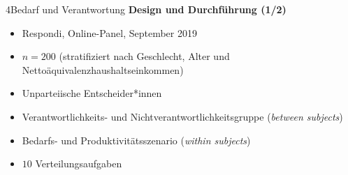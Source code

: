 \documentclass[xcolor=table,9pt,aspectratio=169]{beamer}
\begin{document}
\begin{frame}{\vspace*{10mm}4\hspace*{1em}Bedarf und Verantwortung}
\textbf{Design und Durchführung (1/2)}\\
\medskip
\begin{itemize}
   \item Respondi, Online-Panel, September 2019
   \item $n=200$ (stratifiziert nach Geschlecht, Alter und Nettoäquivalenzhaushaltseinkommen)
   \item Unparteiische Entscheider*innen
   \item Verantwortlichkeits- und Nichtverantwortlichkeitsgruppe (\textit{between subjects})
   \item Bedarfs- und Produktivitätsszenario (\textit{within subjects})
   \item $10$ Verteilungsaufgaben
\end{itemize}
\end{frame}
\end{document}
